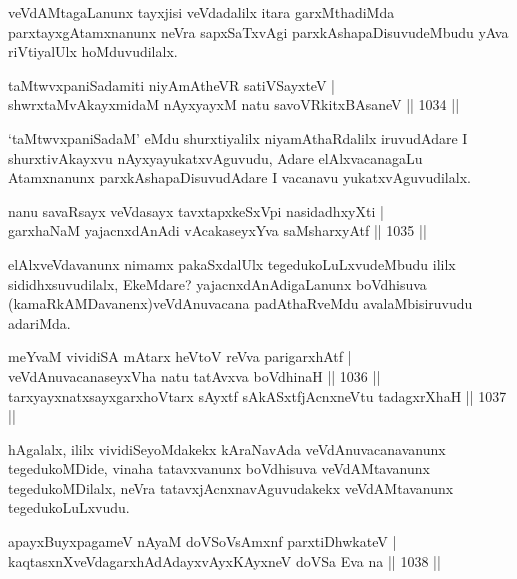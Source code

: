 \begin{artha}
veVdAMtagaLanunx tayxjisi veVdadalilx itara garxMthadiMda parxtayxgAtamxnanunx neVra
sapxSaTxvAgi parxkAshapaDisuvudeMbudu yAva riVtiyalUlx hoMduvudilalx.
\end{artha}

\begin{shl}
taMtwvxpaniSadamiti niyAmAtheVR satiVSayxteV |\\
shwrxtaMvAkayxmidaM nAyxyayxM natu savoVRkitxBAsaneV || 1034 ||
\end{shl}

\begin{artha}
`taMtwvxpaniSadaM' eMdu shurxtiyalilx niyamAthaRdalilx iruvudAdare I shurxtivAkayxvu 
nAyxyayukatxvAguvudu, Adare elAlxvacanagaLu Atamxnanunx parxkAshapaDisuvudAdare I vacanavu 
yukatxvAguvudilalx.
\end{artha}


\begin{shl}
nanu savaRsayx veVdasayx tavxtapxkeSxV\s pi nasidadhxyXti |\\
garxhaNaM yajacnxdAnAdi vAcakaseyxYva saMsharxyAtf || 1035 ||
\end{shl}

\begin{artha}
elAlxveVdavanunx nimamx pakaSxdalUlx tegedukoLuLxvudeMbudu ililx sididhxsuvudilalx, EkeMdare? yajacnxdAnAdigaLanunx boVdhisuva (kamaRkAMDavanenx)veVdAnuvacana padAthaRveMdu avalaMbisiruvudu adariMda.
\end{artha}


\begin{shl}
meYvaM vividiSA mAtarx heVtoV reVva parigarxhAtf |\\
veVdAnuvacanaseyxVha natu tatAvxva boVdhinaH || 1036 ||\\
tarxyayxnatxsayxgarxhoVtarx sAyxtf sAkASxtfjAcnxneVtu tadagxrXhaH || 1037 ||
\end{shl}

\begin{artha}
hAgalalx, ililx vividiSeyoMdakekx kAraNavAda veVdAnuvacanavanunx tegedukoMDide, vinaha 
tatavxvanunx boVdhisuva veVdAMtavanunx tegedukoMDilalx, neVra tatavxjAcnxnavAguvudakekx 
veVdAMtavanunx tegedukoLuLxvudu.
\end{artha}

\begin{shl}
apayxBuyxpagameV nAyaM doVSoV\s sAmxnf parxtiDhwkateV |\\
kaqtasxnXveVdagarxhAdAdayxvAyxKAyxneV doVSa Eva na || 1038 ||
\end{shl}

